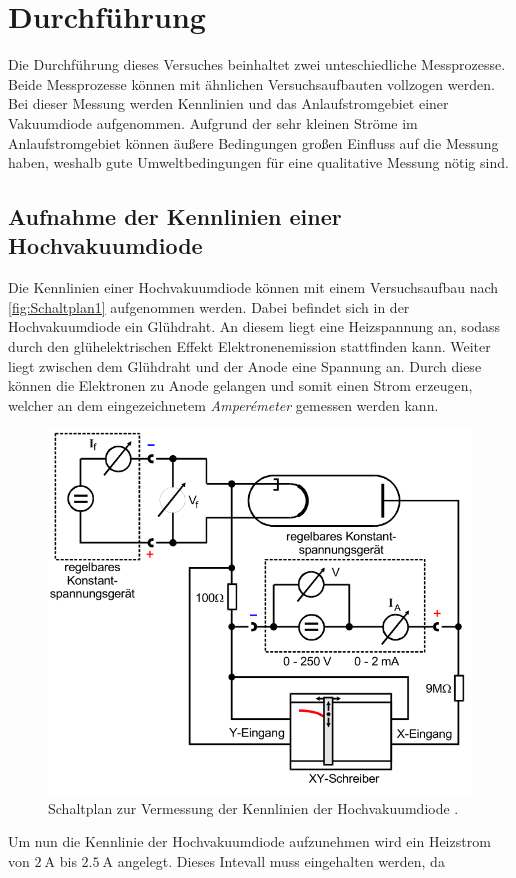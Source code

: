 \section{Durchführung}
\label{sec:Durchführung}

Die Durchführung dieses Versuches beinhaltet zwei unteschiedliche Messprozesse. Beide Messprozesse können mit ähnlichen Versuchsaufbauten vollzogen werden. Bei dieser Messung
werden Kennlinien und das Anlaufstromgebiet einer Vakuumdiode aufgenommen. Aufgrund der sehr kleinen Ströme im Anlaufstromgebiet können äußere Bedingungen großen Einfluss
auf die Messung haben, weshalb gute Umweltbedingungen für eine qualitative Messung nötig sind. 

\subsection{Aufnahme der Kennlinien einer Hochvakuumdiode}
\label{subsec:D_Kennlinien}
Die Kennlinien einer Hochvakuumdiode können mit einem Versuchsaufbau nach \autoref{fig:Schaltplan1} aufgenommen werden. Dabei befindet sich in der Hochvakuumdiode ein Glühdraht.
An diesem liegt eine Heizspannung an, sodass durch den glühelektrischen Effekt Elektronenemission stattfinden kann. Weiter liegt zwischen dem Glühdraht und der Anode eine 
Spannung an. Durch diese können die Elektronen zu Anode gelangen und somit einen Strom erzeugen, welcher an dem eingezeichnetem \textit{Amperémeter} gemessen werden kann.
\begin{figure}
    \centering
    \includegraphics[width = .6\textwidth]{content/Schaltplan1.png}
    \caption{Schaltplan zur Vermessung der Kennlinien der Hochvakuumdiode \cite{v504}.}
    \label{fig:Schaltplan1}
\end{figure}
Um nun die Kennlinie der Hochvakuumdiode aufzunehmen wird ein Heizstrom von $\qty{2}{\ampere}$ bis $\qty{2.5}{\ampere}$ angelegt. Dieses Intevall muss eingehalten werden, da
